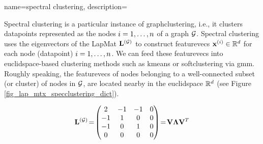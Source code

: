 {name={spectral clustering},
	description={Spectral clustering is a particular instance of 
		\gls{graphclustering}, i.e., it clusters \gls{datapoint}s 
		represented as the nodes $i=1,\ldots,n$ of a \gls{graph} $\mathcal{G}$. 
		Spectral clustering uses the \gls{eigenvector}s of the \gls{LapMat} ${\bf L}^{(\mathcal{G})}$ 
		to construct \gls{featurevec}s ${\bf x}^{(i)} \in \mathbb{R}^{d}$ 
		for each node (\gls{datapoint}) $i=1,\ldots,n$. We can feed these \gls{featurevec}s 
		into \gls{euclidspace}-based \gls{clustering} methods such as \gls{kmeans} 
		or \gls{softclustering} via \gls{gmm}. Roughly speaking, the \gls{featurevec}s of nodes 
		belonging to a well-connected subset (or \gls{cluster}) of nodes in $\mathcal{G}$, are located 
		nearby in the \gls{euclidspace} $\mathbb{R}^{d}$ (see Figure \ref{fig_lap_mtx_specclustering_dict}). 
		\begin{figure}
			\begin{center}
				\begin{minipage}{0.4\textwidth}
				\end{minipage} 
				\hspace*{5mm}
				\begin{minipage}{0.4\textwidth}
					\begin{equation} 
						\LapMat{\graph}\!=\!
						\begin{pmatrix} 
							2 & -1 & -1 & 0 \\ 
							-1 & 1 & 0 & 0 \\  
							-1 & 0 & 1 & 0 \\ 
							0 & 0 & 0 & 0 
						\end{pmatrix}\!=\!\mathbf{V} {\bm \Lambda} \mathbf{V}^{T}  

\end{equation}
\end{minipage}
\end{center}
\end{figure}}}
